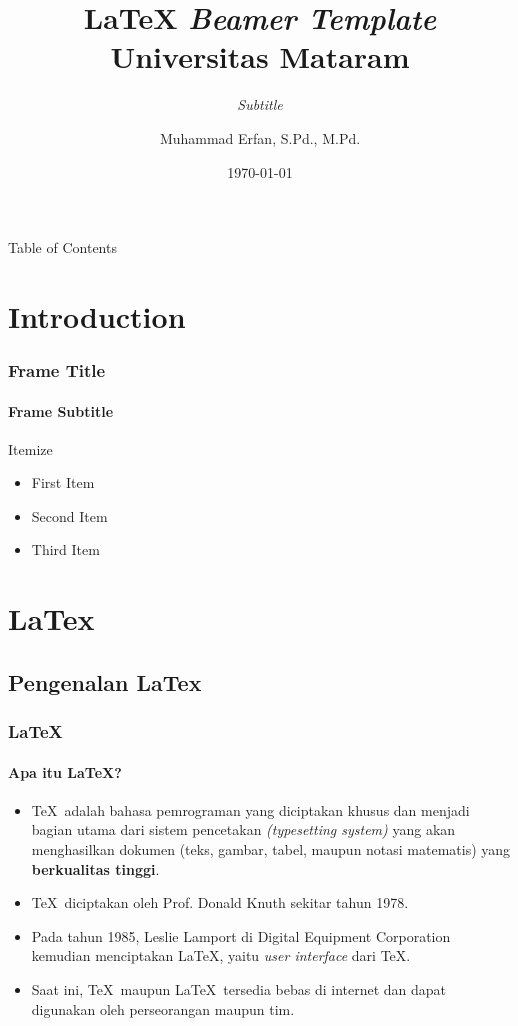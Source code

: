 \documentclass[aspectratio=169]{beamer}
\title{\LaTeX{} \textit{Beamer Template} Universitas Mataram}
\subtitle{\textit{Subtitle}}
\author{Muhammad Erfan, S.Pd., M.Pd.}
\date{\today}
\institute{email: \url{muhammaderfan@unram.ac.id}}
\begin{document}
\begin{frame}[plain]
\titlepage
\end{frame}

\begin{frame}{Table of Contents}
    \tableofcontents
\end{frame}

\section{Introduction}
\begin{frame}
\frametitle{Frame Title}
\framesubtitle{Frame Subtitle}
Itemize
\begin{itemize}
    \item First Item
    \item Second Item
    \item Third Item
\end{itemize}
\end{frame}

\section{LaTex}
\subsection{Pengenalan LaTex}
\begin{frame}
\frametitle{\LaTeX}
\framesubtitle{Apa itu \LaTeX?}
\begin{itemize}
    \item \TeX\ adalah bahasa pemrograman yang diciptakan khusus dan menjadi bagian utama dari sistem pencetakan \textit{(typesetting system)} yang akan menghasilkan dokumen (teks, gambar, tabel, maupun notasi matematis) yang \textbf{berkualitas tinggi}.
    \item \TeX\ diciptakan oleh Prof. Donald Knuth sekitar tahun 1978.
    \item Pada tahun 1985, Leslie Lamport di Digital Equipment Corporation kemudian menciptakan \LaTeX, yaitu \textit{user interface} dari \TeX.
    \item Saat ini, \TeX\ maupun \LaTeX\ tersedia bebas di internet dan dapat digunakan oleh perseorangan maupun tim.
\end{itemize}
\end{frame}
\end{document}
